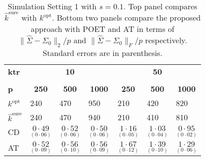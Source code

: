 \documentclass[11pt,oneside]{amsart}
\begin{document}
\begin{table}[htbp!]
\footnotesize
\caption{Simulation Setting 1 with $s = 0.1$. Top panel compares $\widehat{k}^{\text{sure}}$ with $k^{\text{opt}}$. Bottom two panels compare the proposed approach with POET and AT in terms of $\|{\widehat{\Sigma}} - {\Sigma_0}\|_{2}/p$ and $\|{\widehat{\Sigma}} - {\Sigma_0}\|_{F}/p$ respectively. Standard errors are in parenthesis.} \label{table2}
\begin{multicols}{7}
\centering
\begin{tabular}{|p{1.92cm}|p{1.92cm}|p{1.92cm}|p{1.92cm}|p{1.92cm}|p{1.92cm}|p{1.92cm}|} \toprule
{\bf ktr} & \multicolumn{3}{c}{{\bf{10}}}& \multicolumn{3}{c|}{{\bf{50}}} \\
\cmidrule(lr){2-4} \cmidrule(lr){5-7} \\
{\bf p} & \multicolumn{1}{c}{{\bf 250}} & \multicolumn{1}{c}{{\bf 500}} & \multicolumn{1}{c}{{\bf 1000}} & \multicolumn{1}{c}{{\bf 250}} & \multicolumn{1}{c}{{\bf 500}} & \multicolumn{1}{c|}{{\bf 1000}}\\
\hline
${k^{\text{opt}}}$ & 240 & 470 & 950 & 210 & 420 & 820 \\  
${\widehat{k}}^{\text{sure}}$ & 240 & 470 & 940 & 210 & 410 & 810 \\  \hline \hline 
CD & ${\underset{(0\cdot06)}{0\cdot49}}$ & ${\underset{(0\cdot06)}{0\cdot52}}$ & ${\underset{(0\cdot06)}{0\cdot50}}$ & ${\underset{(0\cdot05)}{1\cdot16}}$ & ${\underset{(0\cdot04)}{1\cdot03}}$ & ${\underset{(0\cdot02)}{0\cdot95}}$ \\  
AT & ${\underset{(0\cdot09)}{0\cdot52}}$ & ${\underset{(0\cdot10)}{0\cdot56}}$ & ${\underset{(0\cdot09)}{0\cdot56}}$ & ${\underset{(0\cdot12)}{1\cdot67}}$ & ${\underset{(0\cdot10)}{1\cdot39}}$ & ${\underset{(0\cdot06)}{1\cdot29}}$ \\ 

\end{tabular}
\end{multicols}
\end{table}
\end{document}

